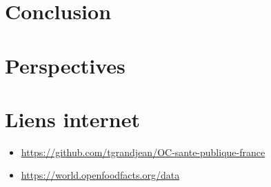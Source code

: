 \section{Conclusion}

\section{Perspectives}


\section{Liens internet}
\label{Liens}
\begin{itemize}
  \item \faGithub \url{https://github.com/tgrandjean/OC-sante-publique-france}
  \item \faDatabase \url{https://world.openfoodfacts.org/data}
\end{itemize}

